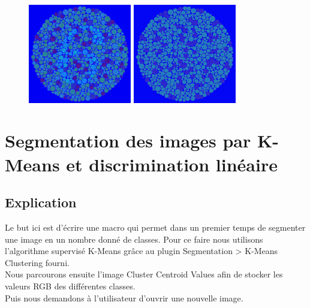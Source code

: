 \documentclass[a4paper]{article}
\begin{document}
\begin{figure}[H]
\begin{center}
\includegraphics[width=170px]{../resultats/cas_4_dalton6_hsb.png}
\includegraphics[width=170px]{../resultats/cas_4_dalton6_hsb_seg.png}
\end{center}
\end{figure}

\clearpage
\section{Segmentation des images par K-Means et discrimination linéaire}

\subsection{Explication}
Le but ici est d'écrire une macro qui permet dans un premier temps de segmenter une image en un nombre donné de classes.
Pour ce faire nous utilisons l'algorithme supervisé K-Means grâce au plugin Segmentation > K-Means Clustering fourni.\\

Nous parcourons ensuite l'image Cluster Centroid Values afin de stocker les valeurs RGB des différentes classes.\\

Puis nous demandons à l'utilisateur d'ouvrir une nouvelle image.\\
\end{document}
